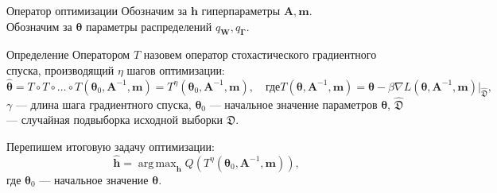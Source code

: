 \documentclass[usenames,dvipsnames,11pt,pdf,utf8,russian,aspectratio=169]{beamer}
\DeclareMathOperator*{\argmax}{arg\,max}
\begin{document}
\begin{frame}{Оператор оптимизации}
\small
Обозначим за $\mathbf{h}$ гиперпараметры $\mathbf{A}, \mathbf{m}$.\\
Обозначим за $\boldsymbol{\theta}$ параметры распределений $q_{\mathbf{W}}, q_{\boldsymbol{\Gamma}}$.

\begin{block}{Определение}
Оператором $T$ назовем оператор стохастического градиентного спуска, производящий $\eta$ шагов оптимизации:
\[
	 \hat{\boldsymbol{\theta}} = T \circ T \circ \dots \circ T(\boldsymbol{\theta}_0, \mathbf{A}^{-1}, \mathbf{m}) = T^\eta(\boldsymbol{\theta}_0, \mathbf{A}^{-1}, \mathbf{m}), \quad\text{где}	T(\boldsymbol{\theta}, \mathbf{A}^{-1}, \mathbf{m}) =\boldsymbol{\theta} - \beta \nabla L(\boldsymbol{\theta}, \mathbf{A}^{-1}, \mathbf{m})|_{\hat{\mathfrak{D}}}, 
\]
$\gamma$ --- длина шага градиентного спуска, $\boldsymbol{\theta}_0$ --- начальное значение параметров $\boldsymbol{\theta}$, $\hat{\mathfrak{D}}$ --- случайная подвыборка исходной выборки $\mathfrak{D}$.
\end{block}

Перепишем итоговую задачу оптимизации:
\[
	\hat{\mathbf{h}} = \argmax_{\mathbf{h}} Q\left( T^\eta(\boldsymbol{\theta}_0, \mathbf{A}^{-1}, \mathbf{m})\right),
\]
где $\boldsymbol{\theta}_0$ --- начальное значение $\boldsymbol{\theta}$.



\end{frame}

\end{document}
